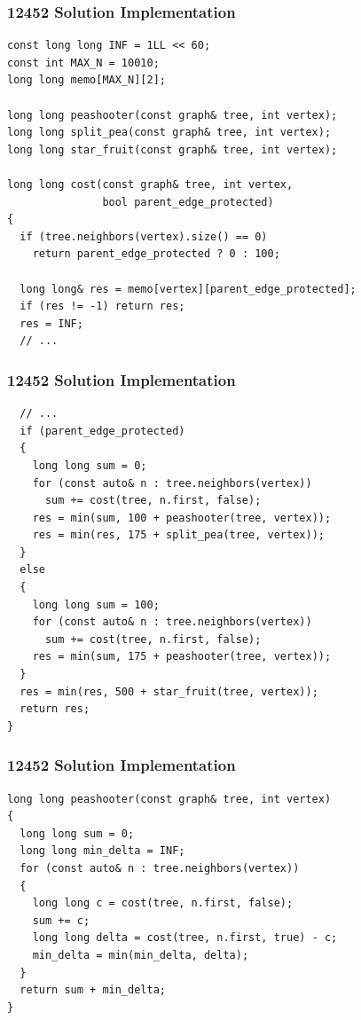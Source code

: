 \documentclass{beamer}
\begin{document}
\begin{frame}[fragile]
\frametitle{12452 Solution Implementation}

\scriptsize
\begin{lstlisting}
const long long INF = 1LL << 60;
const int MAX_N = 10010;
long long memo[MAX_N][2];

long long peashooter(const graph& tree, int vertex);
long long split_pea(const graph& tree, int vertex);
long long star_fruit(const graph& tree, int vertex);

long long cost(const graph& tree, int vertex,
               bool parent_edge_protected)
{
  if (tree.neighbors(vertex).size() == 0)
    return parent_edge_protected ? 0 : 100;

  long long& res = memo[vertex][parent_edge_protected];
  if (res != -1) return res;
  res = INF;
  // ...
\end{lstlisting}

\end{frame}

\begin{frame}[fragile]
\frametitle{12452 Solution Implementation}

\scriptsize
\begin{lstlisting}
  // ...
  if (parent_edge_protected)
  {
    long long sum = 0;
    for (const auto& n : tree.neighbors(vertex))
      sum += cost(tree, n.first, false);
    res = min(sum, 100 + peashooter(tree, vertex));
    res = min(res, 175 + split_pea(tree, vertex));
  }
  else
  {
    long long sum = 100;
    for (const auto& n : tree.neighbors(vertex))
      sum += cost(tree, n.first, false);
    res = min(sum, 175 + peashooter(tree, vertex));
  }
  res = min(res, 500 + star_fruit(tree, vertex));
  return res;
}
\end{lstlisting}

\end{frame}

\begin{frame}[fragile]
\frametitle{12452 Solution Implementation}

\scriptsize
\begin{lstlisting}
long long peashooter(const graph& tree, int vertex)
{
  long long sum = 0;
  long long min_delta = INF;
  for (const auto& n : tree.neighbors(vertex))
  {
    long long c = cost(tree, n.first, false);
    sum += c;
    long long delta = cost(tree, n.first, true) - c;
    min_delta = min(min_delta, delta);
  }
  return sum + min_delta;
}
\end{lstlisting}

\end{frame}
\end{document}
